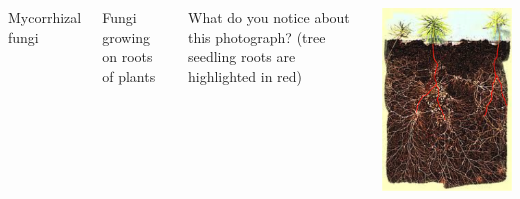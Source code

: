 \begin{frame}[t]
    \begin{adjustwidth}{-2em}{-1.5em}
        \begin{columns}


            Mycorrhizal fungi

            \vspace{4mm}
            Fungi growing on roots of plants

            \vspace{4mm}
            What do you notice about this photograph? (tree seedling roots are
            highlighted in red)



            \includegraphics[width=\columnwidth]{roots.png}

        \end{columns}
    \end{adjustwidth}
\end{frame}

